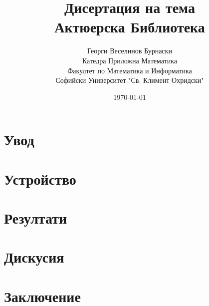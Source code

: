 \documentclass[12pt]{article}
\title{\textbf{Дисертация на тема
        \\[0.5em] \large{Актюерска Библиотека}}}
\author{Георги Веселинов Бурнаски
        \\ Катедра Приложна Математика
        \\ Факултет по Математика и Информатика
        \\ Софийски Университет "Св. Климент Охридски"}
\date{\today}
\begin{document}
\maketitle
\newpage
\section{Увод}


\newpage
\section{Устройство}


\newpage
\section{Резултати}


\newpage
\section{Дискусия}


\newpage
\section{Заключение}
\end{document}
